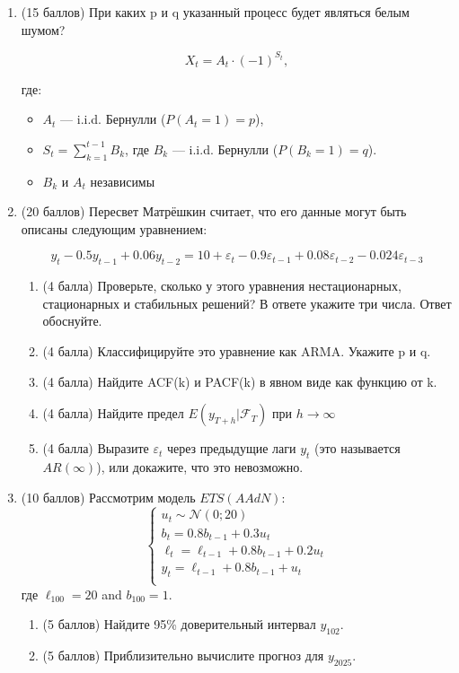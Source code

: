 \documentclass[12pt]{article}
\begin{document}

\begin{enumerate}
	
\item (15 баллов) При каких p и q указанный процесс будет являться белым шумом?

\[
X_t = A_t \cdot (-1)^{S_t},
\]

где:
\begin{itemize}
	\item $A_t$ — i.i.d. Бернулли ($P(A_t = 1) = p$),
	\item $S_t = \sum_{k=1}^{t-1} B_k$, где $B_k$ — i.i.d. Бернулли ($P(B_k = 1) = 	q$).
	\item $B_k$ и $A_t$ независимы
	\end{itemize}

\item (20 баллов) Пересвет Матрёшкин считает, что его данные могут быть описаны следующим уравнением:

\[
y_t - 0.5 y_{t-1} + 0.06 y_{t-2} = 10 + \varepsilon_t - 0.9 \varepsilon_{t-1} + 0.08 \varepsilon_{t-2} - 0.024  \varepsilon_{t-3} 
\]

\begin{enumerate}
\item (4 балла) Проверьте, сколько у этого уравнения нестационарных, стационарных и стабильных решений? В ответе укажите три числа. Ответ обоснуйте.

\item (4 балла) Классифицируйте это уравнение как ARMA. Укажите p и q.

\item (4 балла) Найдите ACF(k) и PACF(k) в явном виде как функцию от k.

\item (4 балла) Найдите предел  $E(y_{T+h}| \mathcal{F}_T)$ при $h \to \infty$

\item (4 балла) Выразите $\varepsilon_t$ через предыдущие лаги $y_t$ (это называется $AR(\infty)$), или докажите, что это невозможно.

\end{enumerate}


\item (10 баллов) Рассмотрим модель $ETS(AAdN)$:
\[
\begin{cases}
	u_t  \sim \mathcal{N}(0;20) \\
	b_t = 0.8 b_{t-1} + 0.3 u_t \\
	\ell_t = \ell_{t-1} + 0.8 b_{t-1} + 0.2 u_t \\
	y_t = \ell_{t-1} + 0.8 b_{t-1} + u_t \\
\end{cases}
\]
где $\ell_{100} = 20$ and $b_{100} = 1$.
\begin{enumerate}
	\item (5 баллов) Найдите 95\% доверительный интервал $y_{102}$.
	\item (5 баллов) Приблизительно вычислите прогноз для $y_{2025}$.
\end{enumerate}



\end{enumerate}
\end{document}
